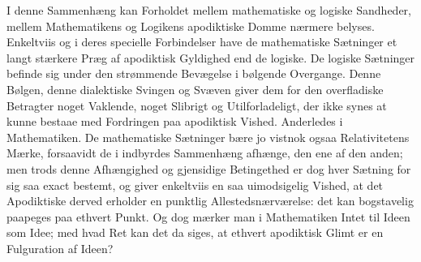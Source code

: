 \documentclass[12pt]{book}
\newcommand{\opage}[1]{\marginnote{\footnotesize\textit{[#1]}}}
\begin{document}
\opage{262}I denne Sammenhæng kan Forholdet mellem mathematiske og logiske Sandheder, mellem Mathematikens og Logikens apodiktiske Domme nærmere belyses. Enkeltviis og i deres specielle Forbindelser have de mathematiske Sætninger et langt stærkere Præg af apodiktisk Gyldighed end de logiske. De logiske Sætninger befinde sig under den strømmende Bevægelse i bølgende Overgange. Denne Bølgen, denne dialektiske Svingen og Svæven giver dem for den overfladiske Betragter noget Vaklende, noget Slibrigt og Utilforladeligt, der ikke synes at kunne bestaae med Fordringen paa apodiktisk Vished. Anderledes i Mathematiken. De mathematiske Sætninger bære jo vistnok ogsaa Relativitetens Mærke, forsaavidt de i indbyrdes Sammenhæng afhænge, den ene af den anden; men trods denne Afhængighed og gjensidige Betingethed er dog hver Sætning for sig saa exact bestemt, og giver enkeltviis en saa uimodsigelig Vished, at det Apodiktiske derved erholder en punktlig Allestedsnærværelse: det kan bogstavelig paapeges paa ethvert Punkt. Og dog mærker man i Mathematiken Intet til Ideen som Idee; med hvad Ret kan det da siges, at ethvert apodiktisk Glimt er en Fulguration af Ideen?
\end{document}
